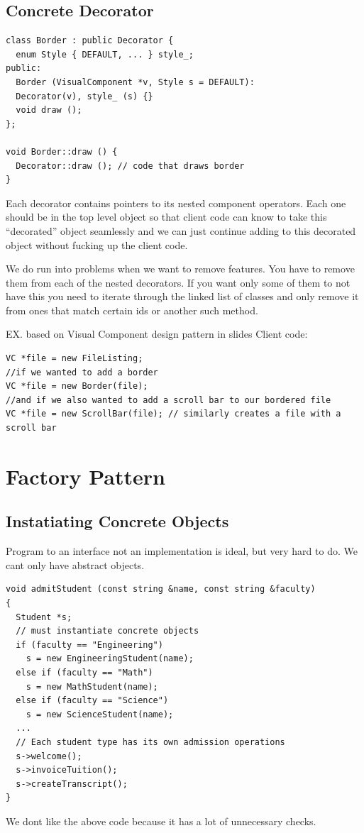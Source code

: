 \documentclass[12pt]{article}
\begin{document}
\subsection*{Concrete Decorator}
\begin{lstlisting}
class Border : public Decorator {
  enum Style { DEFAULT, ... } style_;
public:
  Border (VisualComponent *v, Style s = DEFAULT):
  Decorator(v), style_ (s) {}
  void draw ();
};

void Border::draw () {
  Decorator::draw (); // code that draws border
}
\end{lstlisting}

Each decorator contains pointers to its nested component operators. Each one should be in the top level object so that client code can know to take this ``decorated'' object seamlessly and we can just continue adding to this decorated object without fucking up the client code.

We do run into problems when we want to remove features. You have to remove them from each of the nested decorators. If you want only some of them to not have this you need to iterate through the linked list of classes and only remove it from ones that match certain ids or another such method.

EX. based on Visual Component design pattern in slides
Client code:
\begin{lstlisting}
VC *file = new FileListing;
//if we wanted to add a border
VC *file = new Border(file);
//and if we also wanted to add a scroll bar to our bordered file
VC *file = new ScrollBar(file); // similarly creates a file with a scroll bar
\end{lstlisting}

\section{Factory Pattern}

\subsection*{Instatiating Concrete Objects}
Program to an interface not an implementation is ideal, but very hard to do. We cant only have abstract objects.

\begin{lstlisting}
void admitStudent (const string &name, const string &faculty)
{
  Student *s;
  // must instantiate concrete objects
  if (faculty == "Engineering")
    s = new EngineeringStudent(name);
  else if (faculty == "Math")
    s = new MathStudent(name);
  else if (faculty == "Science")
    s = new ScienceStudent(name);
  ...
  // Each student type has its own admission operations
  s->welcome();
  s->invoiceTuition();
  s->createTranscript();
}
\end{lstlisting}
We dont like the above code because it has a lot of unnecessary checks.
\end{document}
